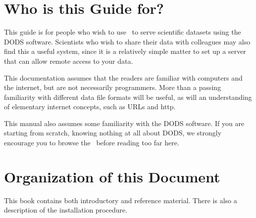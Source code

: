 \section{Who is this Guide for?}
\label{pref,who}

This guide is for people who wish to use \ffnd\ to serve scientific
datasets using the DODS software.  Scientists who wish to share their
data with colleagues may also find this a useful system, since it is a
relatively simple matter to set up a server that can allow remote
access to your data.

This documentation assumes that the readers are familiar with
computers and the internet, but are not necessarily programmers. More
than a passing familiarity with different data file formats will be
useful, as will an understanding of elementary internet concepts, such
as URLs and http.

This manual also assumes some familiarity with the DODS software.  If
you are starting from scratch, knowing nothing at all about DODS, we
strongly encourage you to browse the \DODSuser\ before reading too far
here.  

\section{Organization of this Document}

This book contains both introductory and reference material. There is
also a description of the installation procedure.

